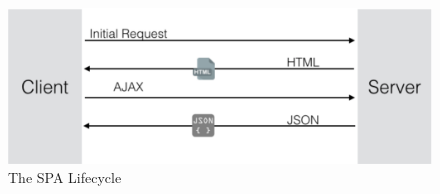 \begin{figure}[htb] %
 \centering
 \includegraphics[width=1.0\linewidth]{images/chapter3/spa.png}\hfill
 \caption[The SPA Lifecycle]{The SPA Lifecycle}
 \label{fig:fourV}
\end{figure}